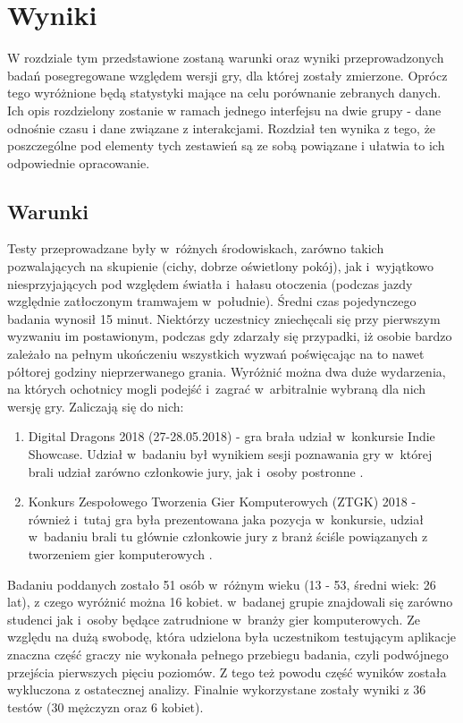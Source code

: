\documentclass[a4paper,12pt,numbers=noenddot]{report}
\begin{document}
\chapter{Wyniki}
W rozdziale tym przedstawione zostaną warunki oraz wyniki przeprowadzonych badań posegregowane względem wersji gry, dla której zostały zmierzone. Oprócz tego wyróżnione będą statystyki mające na celu porównanie zebranych danych. Ich opis rozdzielony zostanie w ramach jednego interfejsu na dwie grupy - dane odnośnie czasu i dane związane z interakcjami. Rozdział ten wynika z tego, że poszczególne pod elementy tych zestawień są ze sobą powiązane i ułatwia to ich odpowiednie opracowanie.

\section{Warunki}
Testy przeprowadzane były w~różnych środowiskach, zarówno takich pozwalających na skupienie (cichy, dobrze oświetlony pokój), jak i~wyjątkowo niesprzyjających pod względem światła i~hałasu otoczenia (podczas jazdy względnie zatłoczonym tramwajem w~południe). Średni czas pojedynczego badania wynosił 15 minut. Niektórzy uczestnicy zniechęcali się przy pierwszym wyzwaniu im postawionym, podczas gdy zdarzały się przypadki, iż osobie bardzo zależało na pełnym ukończeniu wszystkich wyzwań poświęcając na to nawet półtorej godziny nieprzerwanego grania. Wyróżnić można dwa duże wydarzenia, na których ochotnicy mogli podejść i~zagrać w~arbitralnie wybraną dla nich wersję gry. Zaliczają się do nich:
\begin{enumerate}
\item Digital Dragons 2018 (27-28.05.2018) - gra brała udział w~konkursie Indie Showcase. Udział w~badaniu był wynikiem sesji poznawania gry w~której brali udział zarówno członkowie jury, jak i~osoby postronne \cite{online_DD}.
\item Konkurs Zespołowego Tworzenia Gier Komputerowych (ZTGK) 2018 - również i~tutaj gra była prezentowana jaka pozycja w~konkursie, udział w~badaniu brali tu głównie członkowie jury z branż ściśle powiązanych z tworzeniem gier komputerowych \cite{online_ZTGK}.
\end{enumerate}
Badaniu poddanych zostało 51 osób w~różnym wieku (13 - 53, średni wiek: 26 lat), z czego wyróżnić można 16 kobiet. w~badanej grupie znajdowali się zarówno studenci jak i~osoby będące zatrudnione w~branży gier komputerowych. Ze względu na dużą swobodę, która udzielona była uczestnikom testującym aplikacje znaczna część graczy nie wykonała pełnego przebiegu badania, czyli podwójnego przejścia pierwszych pięciu poziomów. Z tego też powodu część wyników została wykluczona z ostatecznej analizy. Finalnie wykorzystane zostały wyniki z 36 testów (30 mężczyzn oraz 6 kobiet).
\end{document}

